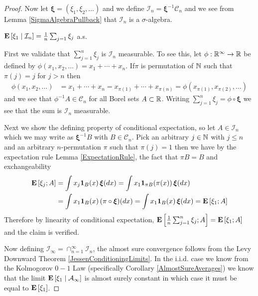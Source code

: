 \begin{proof}
Now let $\boldsymbol{\xi} = (\xi_1, \xi_2, \dotsc)$ and we define $\mathcal{I}_n = \boldsymbol{\xi}^{-1} \mathcal{C}_n$ and we see from Lemma \ref{SigmaAlgebraPullback} that $\mathcal{I}_n$ is a $\sigma$-algebra.
\begin{clm}$\cexpectationlong{\mathcal{I}_n}{\xi_1} = \frac{1}{n} \sum_{j=1} \xi_j$ a.s.
\end{clm}
First we validate that $\sum_{j=1}^n \xi_j$ is $\mathcal{I}_n$ measurable.  To see this, let $\phi : \reals^\infty \to \reals$ be defined by $\phi(x_1, x_2, \dots) = x_1 + \dotsb + x_n$.  If$\pi$ is permutation of $\naturals$ such that $\pi(j) = j$ for $j > n$ then 
\begin{align*}
\phi(x_1, x_2, \dotsc ) &= x_1 + \dotsb + x_n = x_{\pi(1)} + \dotsb + x_{\pi(n)} = \phi(x_{\pi(1)}, x_{\pi(2)}, \dotsc)
\end{align*}
and we see that $\phi^{-1} A \in \mathcal{C}_n$ for all Borel sets $A \subset \reals$.  Writing $\sum_{j=1}^n \xi_j = \phi \circ \boldsymbol{\xi}$ we see that the sum is $\mathcal{I}_n$ measurable.  

Next we show the defining property of conditional expectation, so let $A \in \mathcal{I}_n$ which we may write as $\boldsymbol{\xi}^{-1} B$ with $B \in \mathcal{C}_n$.  Pick an arbitrary $j \in \naturals$ with $j \leq n$ and an arbitrary $n$-permutation $\pi$ such that $\pi (j) = 1$ then we have by the expectation rule Lemma \ref{ExpectationRule}, the fact that $\pi B = B$ and exchangeability
\begin{align*}
\expectation{\xi_j ; A} 
&= \int x_j \characteristic{B}(x) \, \boldsymbol{\xi}(dx) 
= \int x_1 \characteristic{\pi B}(\pi(x)) \, \boldsymbol{\xi}(dx) \\
&= \int x_1 \characteristic{B}(x) \, (\pi \circ \boldsymbol{\xi})(dx) 
= \int x_1 \characteristic{B}(x) \, \boldsymbol{\xi}(dx) 
= \expectation{\xi_1 ; A}
\end{align*}
Therefore by linearity of conditional expectation, $\expectation{\frac{1}{n} \sum_{j=1}^n \xi_j ; A} = \expectation{\xi_1 ; A}$ and the claim is verified.

Now defining $\mathcal{I}_\infty = \cap_{n=1}^\infty \mathcal{I}_n$, the almost sure convergence follows from the Levy Downward Theorem \ref{JessenConditioningLimits}.  In the i.i.d. case we know from the Kolmogorov $0-1$ Law (specifically Corollary \ref{AlmostSureAverages}) we know that the limit $\cexpectationlong{\mathcal{A}_\infty}{\xi_1}$ is almost surely constant in which case it must be equal to $\expectation{\xi_1}$.
\end{proof}



